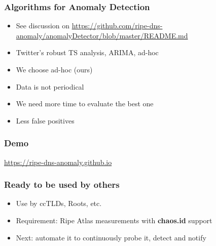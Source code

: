 \documentclass[serif]{beamer}
\begin{document}
\begin{frame}[fragile]
	\frametitle{Algorithms for Anomaly Detection}
	\begin{itemize}
	 \item See discussion on 
\url{https://github.com/ripe-dns-anomaly/anomalyDetector/blob/master/README.md}
	\item Twitter's robust TS analysis, ARIMA, ad-hoc
	\item We choose ad-hoc (ours)
	\item Data is not periodical
	\item We need more time to evaluate the best one
	\item Less false positives
	\end{itemize}


\end{frame}


\begin{frame}[fragile]
	\frametitle{Demo}
	
	\large
	\url{https://ripe-dns-anomaly.github.io}

\end{frame}


\begin{frame}[fragile]
	\frametitle{Ready to be used by others}
\begin{itemize}
 \item Use by ccTLDs, Roots, etc.
 \item Requirement: Ripe Atlas measurements with \textbf{chaos.id} support
 \item Next: automate it to continuously probe it, detect and notify
\end{itemize}

\end{frame}
\end{document}
